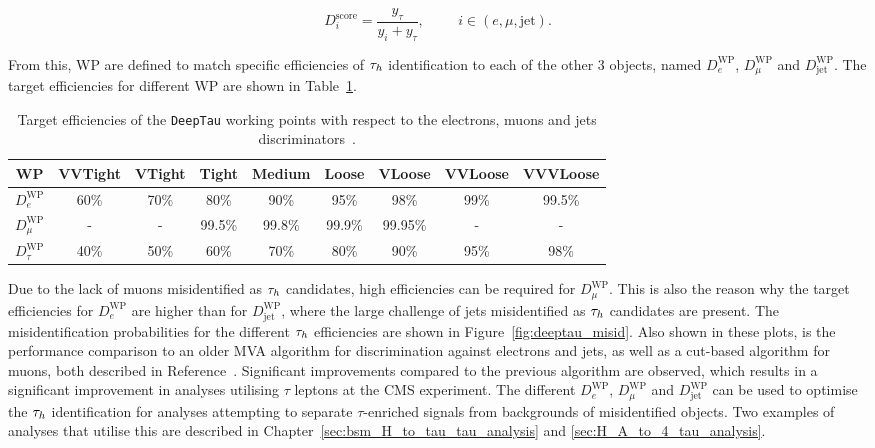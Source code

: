 \begin{equation}
D_{i}^{\text{score}} = \frac{y_\tau}{y_i + y_{\tau}}, \hspace{1cm} i \in (e,\mu,\text{jet}).
\end{equation}

From this, \ac{WP} are defined to match specific efficiencies of $\tau_{h}$ identification to each of the other 3 objects, named $D_{e}^{\text{WP}}$, $D_{\mu}^{\text{WP}}$ and $D_{\text{jet}}^{\text{WP}}$.
The target efficiencies for different \ac{WP} are shown in Table~\ref{tab:deeptau_eff}. \\

\begin{table}[!hbtp]
\begin{adjustwidth}{-1cm}{-1cm}
\centering
\begin{tabular}{|c|cccccccc|}
\hline
WP                     & VVTight & VTight & Tight  & Medium & Loose  & VLoose  & VVLoose & VVVLoose \\
\hline 
\hline
$D_{e}^{\text{WP}}$    & 60\%    & 70\%   & 80\%   & 90\%   & 95\%   & 98\%    & 99\%    & 99.5\%   \\
$D_{\mu}^{\text{WP}}$  & -       & -      & 99.5\% & 99.8\% & 99.9\% & 99.95\% & -       & -        \\
$D_{\tau}^{\text{WP}}$ & 40\%    & 50\%   & 60\%   & 70\%   & 80\%   & 90\%    & 95\%    & 98\%     \\
\hline
\end{tabular}
\caption{Target efficiencies of the \texttt{DeepTau} working points with respect to the electrons, muons and jets discriminators~\cite{CMS:2022prd}.}
\label{tab:deeptau_eff}
\end{adjustwidth}
\end{table}

Due to the lack of muons misidentified as $\tau_{h}$ candidates, high efficiencies can be required for $D_{\mu}^{\text{WP}}$.
This is also the reason why the target efficiencies for $D_{e}^{\text{WP}}$ are higher than for $D_{\text{jet}}^{\text{WP}}$, where the large challenge of jets misidentified as $\tau_{h}$ candidates are present.
The misidentification probabilities for the different $\tau_{h}$ efficiencies are shown in Figure~\ref{fig:deeptau_misid}.
Also shown in these plots, is the performance comparison to an older \ac{MVA} algorithm for discrimination against electrons and jets, as well as a cut-based algorithm for muons, both described in Reference~\cite{CMS:2018jrd}.
Significant improvements compared to the previous algorithm are observed, which results in a significant improvement in analyses utilising $\tau$ leptons at the \ac{CMS} experiment.
The different $D_{e}^{\text{WP}}$, $D_{\mu}^{\text{WP}}$ and $D_{\text{jet}}^{\text{WP}}$ can be used to optimise the $\tau_{h}$ identification for analyses attempting to separate $\tau$-enriched signals from backgrounds of misidentified objects.
Two examples of analyses that utilise this are described in Chapter~\ref{sec:bsm_H_to_tau_tau_analysis} and \ref{sec:H_A_to_4_tau_analysis}.

